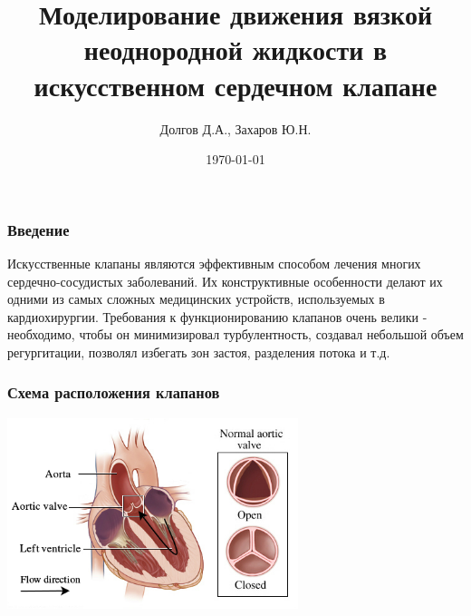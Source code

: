 \documentclass[14pt]{beamer}
\title[Моделирование движения жидкости в клапане]{Моделирование движения вязкой неоднородной жидкости в искусственном сердечном клапане}
\date{\today}
\author[Долгов Д.А.]{Долгов Д.А., Захаров Ю.Н.}
\institute{Кемеровский Государственный Университет \\
    \vspace{0.7cm}
    \vspace{0.7cm}
}
\begin{document}
\maketitle

\begin{frame}
\frametitle{Введение}
Искусственные клапаны являются эффективным способом лечения многих сердечно-сосудистых заболеваний. Их конструктивные особенности делают их одними из самых сложных медицинских устройств, используемых в кардиохирургии. Требования к функционированию клапанов очень велики - необходимо, чтобы он минимизировал турбулентность, создавал небольшой объем регургитации, позволял избегать зон застоя, разделения потока и т.д.
\end{frame}

\begin{frame}
\frametitle{Схема расположения клапанов}
    \begin{center}
        \includegraphics[width=8.5cm]{aorta_scheme.png}
    \end{center}
\end{frame}
\end{document}
